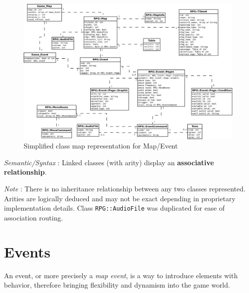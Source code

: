\documentclass[11pt]{article}
\begin{document}
\begin{figure}[!h]
	\centering
	\includegraphics[width=\linewidth]{RMXP_full}
		\caption{Simplified class map representation for Map/Event}
	
\end{figure}


\textit{Semantic/Syntax} : Linked classes (with arity) display an \textbf{associative relationship}.

\textit{Note} : There is no inheritance relationship between any two classes represented. Arities are logically deduced and may not be exact depending in proprietary implementation details. Class \verb|RPG::AudioFile| was duplicated for ease of association routing.


\newpage
\section{Events}

An event, or more precisely a \textit{map event}, is a way to introduce elements with behavior, therefore bringing flexibility and dynamism into the game world.
\end{document}
